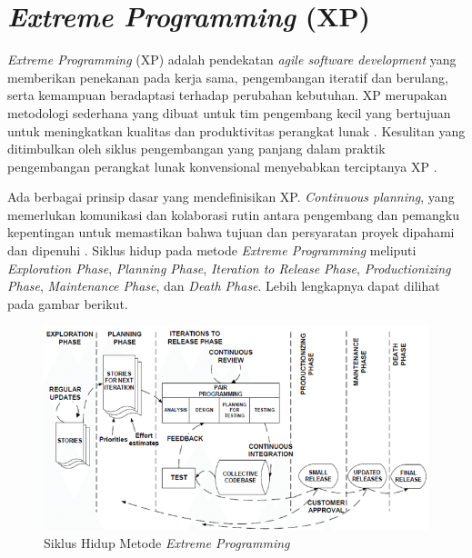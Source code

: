 \section{\textit{Extreme Programming} (XP)}

\noindent \textit{Extreme Programming} (XP) adalah pendekatan \textit{agile software development} yang memberikan penekanan pada kerja sama, pengembangan iteratif dan berulang, serta kemampuan beradaptasi terhadap perubahan kebutuhan. XP merupakan metodologi sederhana yang dibuat untuk tim pengembang kecil yang bertujuan untuk meningkatkan kualitas dan produktivitas perangkat lunak \parencite{article:matharu}. Kesulitan yang ditimbulkan oleh siklus pengembangan yang panjang dalam praktik pengembangan perangkat lunak konvensional menyebabkan terciptanya XP \parencite{article:rao}.

Ada berbagai prinsip dasar yang mendefinisikan XP. \textit{Continuous planning}, yang memerlukan komunikasi dan kolaborasi rutin antara pengembang dan pemangku kepentingan untuk memastikan bahwa tujuan dan persyaratan proyek dipahami dan dipenuhi \parencite{article:matharu}. Siklus hidup pada metode \textit{Extreme Programming} meliputi \textit{Exploration Phase}, \textit{Planning Phase}, \textit{Iteration to Release Phase}, \textit{Productionizing Phase}, \textit{Maintenance Phase}, dan \textit{Death Phase}. Lebih lengkapnya dapat dilihat pada gambar berikut.

\begin{figure}[ht]
    \includegraphics[width=1\linewidth, center]{images/tinjauan-pustaka/fig-xp-lifecycle.png}
    \caption{Siklus Hidup Metode \textit{Extreme Programming} \parencite{article:anwer}}
    \label{fig:xp-lifecycle}
\end{figure}


